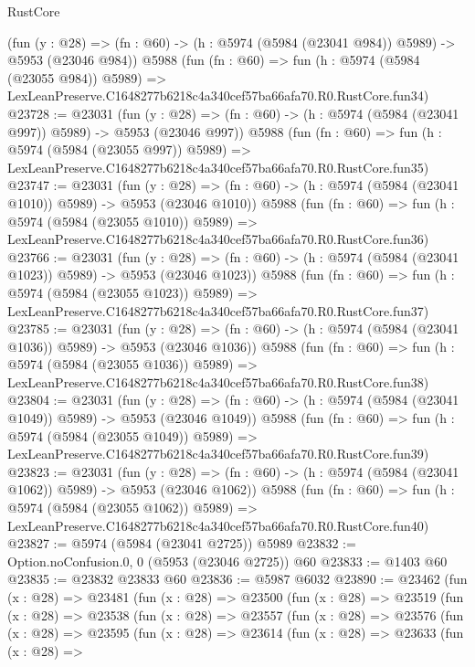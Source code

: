 \begin{lexlean}{RustCore}
\begin{coremodule}
    (fun (y : @28) => (fn : @60) -> (h : @5974 (@5984 (@23041 @984)) @5989) -> @5953 (@23046 @984))
    @5988
    (fun (fn : @60) =>
    fun (h : @5974 (@5984 (@23055 @984)) @5989) =>
    LexLeanPreserve.C1648277b6218c4a340cef57ba66afa70.R0.RustCore.fun34)
@23728 := @23031
    (fun (y : @28) => (fn : @60) -> (h : @5974 (@5984 (@23041 @997)) @5989) -> @5953 (@23046 @997))
    @5988
    (fun (fn : @60) =>
    fun (h : @5974 (@5984 (@23055 @997)) @5989) =>
    LexLeanPreserve.C1648277b6218c4a340cef57ba66afa70.R0.RustCore.fun35)
@23747 := @23031
    (fun (y : @28) =>
    (fn : @60) -> (h : @5974 (@5984 (@23041 @1010)) @5989) -> @5953 (@23046 @1010))
    @5988
    (fun (fn : @60) =>
    fun (h : @5974 (@5984 (@23055 @1010)) @5989) =>
    LexLeanPreserve.C1648277b6218c4a340cef57ba66afa70.R0.RustCore.fun36)
@23766 := @23031
    (fun (y : @28) =>
    (fn : @60) -> (h : @5974 (@5984 (@23041 @1023)) @5989) -> @5953 (@23046 @1023))
    @5988
    (fun (fn : @60) =>
    fun (h : @5974 (@5984 (@23055 @1023)) @5989) =>
    LexLeanPreserve.C1648277b6218c4a340cef57ba66afa70.R0.RustCore.fun37)
@23785 := @23031
    (fun (y : @28) =>
    (fn : @60) -> (h : @5974 (@5984 (@23041 @1036)) @5989) -> @5953 (@23046 @1036))
    @5988
    (fun (fn : @60) =>
    fun (h : @5974 (@5984 (@23055 @1036)) @5989) =>
    LexLeanPreserve.C1648277b6218c4a340cef57ba66afa70.R0.RustCore.fun38)
@23804 := @23031
    (fun (y : @28) =>
    (fn : @60) -> (h : @5974 (@5984 (@23041 @1049)) @5989) -> @5953 (@23046 @1049))
    @5988
    (fun (fn : @60) =>
    fun (h : @5974 (@5984 (@23055 @1049)) @5989) =>
    LexLeanPreserve.C1648277b6218c4a340cef57ba66afa70.R0.RustCore.fun39)
@23823 := @23031
    (fun (y : @28) =>
    (fn : @60) -> (h : @5974 (@5984 (@23041 @1062)) @5989) -> @5953 (@23046 @1062))
    @5988
    (fun (fn : @60) =>
    fun (h : @5974 (@5984 (@23055 @1062)) @5989) =>
    LexLeanPreserve.C1648277b6218c4a340cef57ba66afa70.R0.RustCore.fun40)
@23827 := @5974 (@5984 (@23041 @2725)) @5989
@23832 := Option.noConfusion.{0, 0} (@5953 (@23046 @2725)) @60
@23833 := @1403 @60
@23835 := @23832 @23833 @60
@23836 := @5987 @6032
@23890 := @23462
    (fun (x : @28) =>
    @23481
      (fun (x : @28) =>
      @23500
        (fun (x : @28) =>
        @23519
          (fun (x : @28) =>
          @23538
            (fun (x : @28) =>
            @23557
              (fun (x : @28) =>
              @23576
                (fun (x : @28) =>
                @23595
                  (fun (x : @28) =>
                  @23614
                    (fun (x : @28) =>
                    @23633
                      (fun (x : @28) =>

\end{coremodule}
\end{lexlean}
